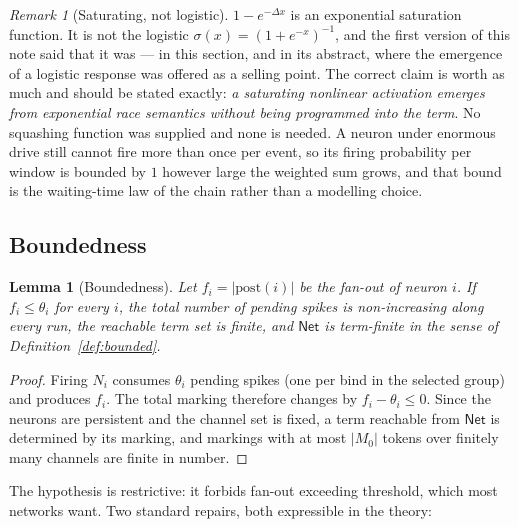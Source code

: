 \documentclass[11pt,a4paper]{article}
\theoremstyle{plain}
\newtheorem{lemma}[theorem]{Lemma}
\theoremstyle{definition}
\theoremstyle{remark}
\newtheorem{remark}[theorem]{Remark}
\begin{document}
\begin{remark}[Saturating, not logistic]
\label{rem:not-logistic}
$1 - e^{-\Delta x}$ is an exponential saturation function. It is not the logistic
$\sigma(x) = (1+e^{-x})^{-1}$, and the first version of this note said that it was --- in this
section, and in its abstract, where the emergence of a logistic response was offered as a selling
point. The correct claim is worth as much and should be stated exactly: \emph{a saturating nonlinear
activation emerges from exponential race semantics without being programmed into the term}. No
squashing function was supplied and none is needed. A neuron under enormous drive still cannot fire
more than once per event, so its firing probability per window is bounded by $1$ however large the
weighted sum grows, and that bound is the waiting-time law of the chain rather than a modelling
choice.
\end{remark}

\subsection{Boundedness}
\label{sec:rnn-bounded}

\begin{lemma}[Boundedness]
\label{lem:bounded}
Let $f_i = |\mathrm{post}(i)|$ be the fan-out of neuron $i$. If $f_i \leq \theta_i$ for every $i$,
the total number of pending spikes is non-increasing along every run, the reachable term set is
finite, and $\mathsf{Net}$ is term-finite in the sense of Definition~\ref{def:bounded}.
\end{lemma}

\begin{proof}
Firing $N_i$ consumes $\theta_i$ pending spikes (one per bind in the selected group) and produces
$f_i$. The total marking therefore changes by $f_i - \theta_i \leq 0$. Since the neurons are
persistent and the channel set is fixed, a term reachable from $\mathsf{Net}$ is determined by its
marking, and markings with at most $|M_0|$ tokens over finitely many channels are finite in number.
\end{proof}

The hypothesis is restrictive: it forbids fan-out exceeding threshold, which most networks want. Two
standard repairs, both expressible in the theory:
\end{document}
